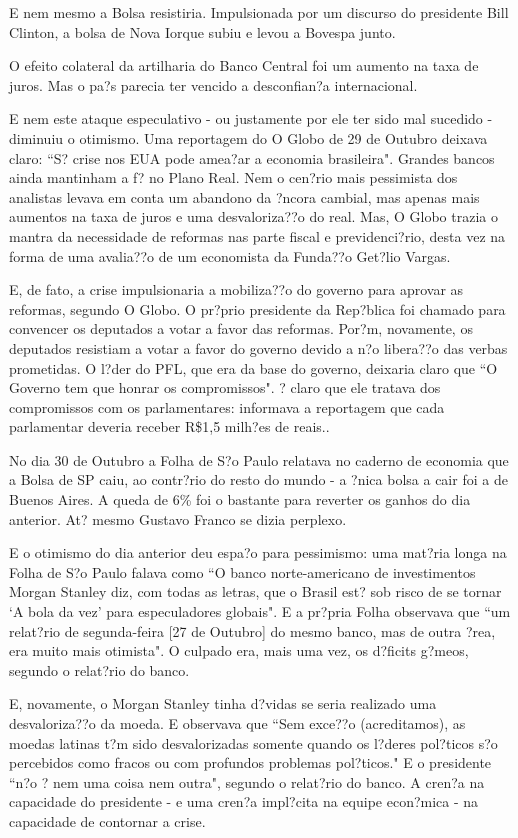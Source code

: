 \documentclass{article}
\begin{document}
E nem mesmo a Bolsa resistiria. Impulsionada por um discurso do presidente Bill Clinton, a bolsa de Nova Iorque subiu e levou a Bovespa junto.  

O efeito colateral da artilharia do Banco Central foi um aumento na taxa de juros. Mas o pa?s parecia ter vencido a desconfian?a internacional. 

E nem este ataque especulativo - ou justamente por ele ter sido mal sucedido - diminuiu o otimismo. Uma reportagem do O Globo de 29 de Outubro deixava claro: ``S? crise nos EUA pode amea?ar a economia brasileira". Grandes bancos ainda mantinham a f? no Plano Real. Nem o cen?rio mais pessimista dos analistas levava em conta um abandono da ?ncora cambial, mas apenas mais aumentos na taxa de juros e uma desvaloriza??o do real. Mas, O Globo trazia o mantra da necessidade de reformas nas parte fiscal e previdenci?rio, desta vez na forma de uma avalia??o de um economista da Funda??o Get?lio Vargas.

E, de fato, a crise impulsionaria a mobiliza??o do governo para aprovar as reformas, segundo O Globo. O pr?prio presidente da Rep?blica foi chamado para convencer os deputados a votar a favor das reformas. Por?m, novamente, os deputados resistiam a votar a favor do governo devido a n?o libera??o das verbas prometidas. O l?der do PFL, que era da base do governo, deixaria claro que  ``O Governo tem que honrar os compromissos". ? claro que ele tratava dos compromissos com os parlamentares: informava a reportagem que cada parlamentar deveria receber R\$1,5 milh?es de reais..  %

No dia 30 de Outubro a Folha de S?o Paulo relatava no caderno de economia que a Bolsa de SP caiu, ao contr?rio do resto do mundo - a ?nica bolsa a cair foi a de Buenos Aires. A queda de 6\% foi o bastante para reverter os ganhos do dia anterior. At? mesmo Gustavo Franco se dizia perplexo.

E o otimismo do dia anterior deu espa?o para pessimismo: uma mat?ria longa na Folha de S?o Paulo falava como ``O banco norte-americano de investimentos Morgan Stanley diz, com todas as letras, que o Brasil est? sob risco de se tornar `A bola da vez' para especuladores globais". E a pr?pria Folha observava que ``um relat?rio de segunda-feira [27 de Outubro] do mesmo banco, mas de outra ?rea, era muito mais otimista". O culpado era, mais uma vez, os d?ficits g?meos, segundo o relat?rio do banco.

E, novamente, o Morgan Stanley tinha d?vidas se seria realizado uma desvaloriza??o da moeda. E observava que ``Sem exce??o (acreditamos), as moedas latinas t?m sido desvalorizadas somente quando os l?deres pol?ticos s?o percebidos como fracos ou com profundos problemas pol?ticos." E o presidente ``n?o ? nem uma coisa nem outra", segundo o relat?rio do banco. A cren?a na capacidade do presidente - e uma cren?a impl?cita na equipe econ?mica - na capacidade de contornar a crise. 
\end{document}
